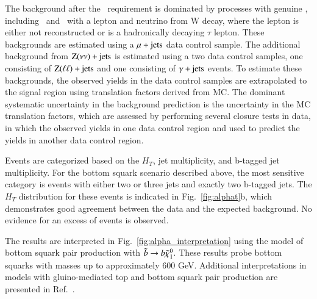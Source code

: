 The background after the \alphat\ requirement is dominated by processes with genuine \met, including \ttljets\ and \wjets\ with a lepton and neutrino from W decay,
where the lepton is either not reconstructed or is a hadronically decaying $\tau$ lepton. 
These backgrounds are estimated using a $\mu+\rm{jets}$ data control sample.
The additional background from $\rm{Z}(\nu\nu)+\rm{jets}$ is estimated using a two data control samples, one consisting of $\rm{Z}(\ell\ell)+\rm{jets}$
and one consisting of $\gamma+\rm{jets}$ events. To estimate these backgrounds, the observed yields in the data control samples are extrapolated to the
signal region using translation factors derived from MC. The dominant systematic uncertainty in the background prediction is the uncertainty
in the MC translation factors, which are assessed by performing several closure tests in data, in which the observed yields in one data control region
and used to predict the yields in another data control region.

Events are categorized based on the $H_T$, jet multiplicity, and b-tagged jet multiplicity. For the bottom squark scenario described above, the most sensitive
category is events with either two or three jets and exactly two b-tagged jets. The $H_T$ distribution for these events is indicated in Fig.~\ref{fig:alphat}b,
which demonstrates good agreement between the data and the expected background. No evidence for an excess of events is observed.

The results are interpreted in Fig.~\ref{fig:alpha_interpretation} using the model of bottom squark pair production with $\tilde{b}\to b\tilde{\chi}_{1}^{0}$.
These results probe bottom squarks with masses up to approximately 600 GeV. Additional interpretations in models with gluino-mediated
top and bottom squark pair production are presented in Ref.~\cite{ref:alphat}.

